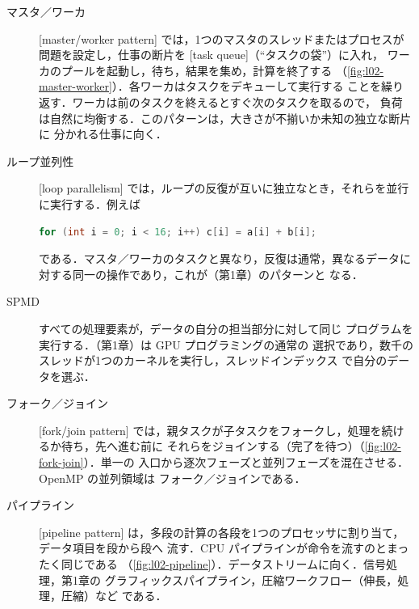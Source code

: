 \documentclass[../main.tex]{subfiles}
\begin{document}
\begin{description}
  \item[マスタ／ワーカ]  [master/worker pattern]
    では，1つのマスタのスレッドまたはプロセスが問題を設定し，仕事の断片を
    [task queue]（\enquote{タスクの袋}）に入れ，
    ワーカのプールを起動し，待ち，結果を集め，計算を終了する
    （\cref{fig:l02-master-worker}）．各ワーカはタスクをデキューして実行する
    ことを繰り返す．ワーカは前のタスクを終えるとすぐ次のタスクを取るので，
    負荷は自然に均衡する．このパターンは，大きさが不揃いか未知の独立な断片に
    分かれる仕事に向く．
  \item[ループ並列性]  [loop parallelism]
    では，ループの反復が互いに独立なとき，それらを並行に実行する．例えば
\begin{lstlisting}[language=C++, numbers=none]
for (int i = 0; i < 16; i++) c[i] = a[i] + b[i];
\end{lstlisting}
    である．マスタ／ワーカのタスクと異なり，反復は通常，異なるデータに
    対する同一の操作であり，これが（第1章）のパターンと
    なる．
  \item[SPMD]  すべての処理要素が，データの自分の担当部分に対して同じ
    プログラムを実行する．（第1章）は GPU プログラミングの通常の
    選択であり，数千のスレッドが1つのカーネルを実行し，スレッドインデックス
    で自分のデータを選ぶ．
  \item[フォーク／ジョイン]  [fork/join pattern]
    では，親タスクが子タスクをフォークし，処理を続けるか待ち，先へ進む前に
    それらをジョインする（完了を待つ）（\cref{fig:l02-fork-join}）．単一の
    入口から逐次フェーズと並列フェーズを混在させる．OpenMP の並列領域は
    フォーク／ジョインである．
  \item[パイプライン]  [pipeline pattern]
    は，多段の計算の各段を1つのプロセッサに割り当て，データ項目を段から段へ
    流す．CPU パイプラインが命令を流すのとまったく同じである
    （\cref{fig:l02-pipeline}）．データストリームに向く．信号処理，第1章の
    グラフィックスパイプライン，圧縮ワークフロー（伸長，処理，圧縮）など
    である．
\end{description}
\end{document}
